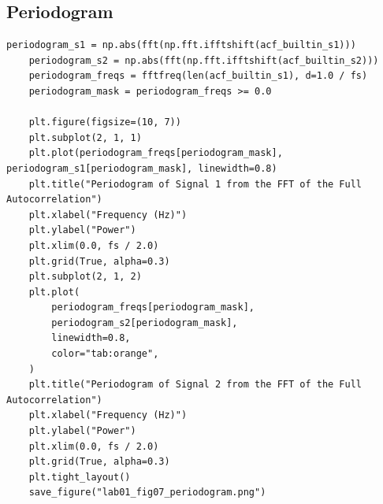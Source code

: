 \documentclass[12pt, a4paper]{article}
\begin{document}
\subsection{Periodogram}
\begin{lstlisting}[caption={Periodogram formation from the FFT of the full autocorrelation sequence.}, label={lst:lab01_periodogram}]
    periodogram_s1 = np.abs(fft(np.fft.ifftshift(acf_builtin_s1)))
    periodogram_s2 = np.abs(fft(np.fft.ifftshift(acf_builtin_s2)))
    periodogram_freqs = fftfreq(len(acf_builtin_s1), d=1.0 / fs)
    periodogram_mask = periodogram_freqs >= 0.0

    plt.figure(figsize=(10, 7))
    plt.subplot(2, 1, 1)
    plt.plot(periodogram_freqs[periodogram_mask], periodogram_s1[periodogram_mask], linewidth=0.8)
    plt.title("Periodogram of Signal 1 from the FFT of the Full Autocorrelation")
    plt.xlabel("Frequency (Hz)")
    plt.ylabel("Power")
    plt.xlim(0.0, fs / 2.0)
    plt.grid(True, alpha=0.3)
    plt.subplot(2, 1, 2)
    plt.plot(
        periodogram_freqs[periodogram_mask],
        periodogram_s2[periodogram_mask],
        linewidth=0.8,
        color="tab:orange",
    )
    plt.title("Periodogram of Signal 2 from the FFT of the Full Autocorrelation")
    plt.xlabel("Frequency (Hz)")
    plt.ylabel("Power")
    plt.xlim(0.0, fs / 2.0)
    plt.grid(True, alpha=0.3)
    plt.tight_layout()
    save_figure("lab01_fig07_periodogram.png")
\end{lstlisting}
\end{document}
